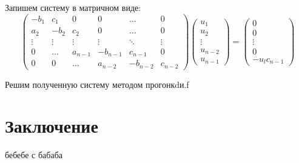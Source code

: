 \documentclass[12pt,a4paper]{article}
\begin{document}
Запишем систему в матричном виде:
\begin{equation}
    \left(
    \begin{array}{cccccc}
    -b_1 & c_1 & 0 & 0 & \ldots &  0\\
    a_{2} & -b_{2} & c_2 & 0 & \ldots &  0\\
    \vdots & \vdots & \vdots & \vdots & \ddots & \vdots\\
    0 & \ldots & a_{n-1} & -b_{n-1} & c_{n-1} & 0 \\
    0 & 0 & \ldots & a_{n-2} & -b_{n-2} & c_{n-2}
    \end{array}
    \right)
    \left(
        \begin{array}{c}
        u_1\\
        u_2\\
        \vdots\\
        u_{n-2} \\
        u_{n-1}
        \end{array}
    \right) =     \left(
        \begin{array}{c}
        0\\
        0\\
        \vdots\\
        0\\
        -u_l c_{n-1}
        \end{array}
    \right)
    \end{equation}

Решим полученную систему методом прогонкdи.f
\section{Заключение}

\begin{thebibliography}{9}
 бебебе с бабаба

\end{thebibliography}




 
\end{document}

